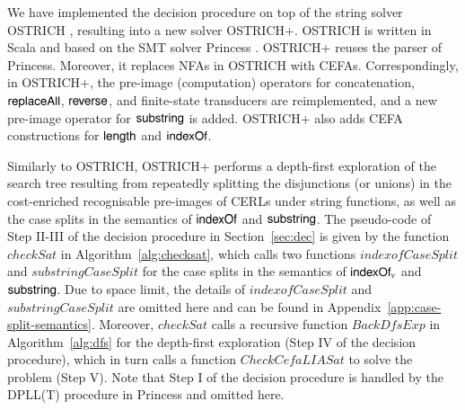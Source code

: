 
We have implemented the decision procedure on top of the string solver OSTRICH \cite{CHL+19}, resulting into a new solver OSTRICH+. OSTRICH is  written in Scala and based on the SMT solver Princess \cite{princess08}. 
OSTRICH+ reuses the parser of Princess. Moreover, it replaces NFAs in OSTRICH with CEFAs. Correspondingly, in OSTRICH+, the pre-image  (computation) operators for concatenation, $\mathsf{replaceAll}$, $\mathsf{reverse}$, and finite-state transducers are reimplemented, and a new pre-image operator for $\mathsf{substring}$ is added. OSTRICH+ also adds CEFA constructions for $\mathsf{length}$ and $\mathsf{indexOf}$.  

Similarly to OSTRICH, OSTRICH+ performs a depth-first exploration of the search tree resulting from repeatedly
splitting the disjunctions (or unions) in the cost-enriched recognisable pre-images of CERLs under string functions, as well as the case splits in the semantics of $\mathsf{indexOf}$ and $\mathsf{substring}$.
The pseudo-code of Step II-III of the decision procedure in Section~\ref{sec:dec} is given by  the function $\mathit{checkSat}$ in Algorithm~\ref{alg:checksat}, which calls two functions $\mathit{indexofCaseSplit}$ and $\mathit{substringCaseSplit}$ for the case splits in the semantics of $\mathsf{indexOf}_v$ and $\mathsf{substring}$. Due to space limit, the details of $\mathit{indexofCaseSplit}$ and $\mathit{substringCaseSplit}$ are omitted here and can be found in Appendix~\ref{app:case-split-semantics}. Moreover,  $\mathit{checkSat}$ calls a recursive function  $\mathit{BackDfsExp}$ in Algorithm~\ref{alg:dfs} for the depth-first exploration (Step IV of the decision procedure), which in turn calls a function $\mathit{CheckCefaLIASat}$ to solve the {\lasat} problem (Step V). Note that Step I of the decision procedure is handled by the DPLL(T) procedure in Princess and omitted here. 

